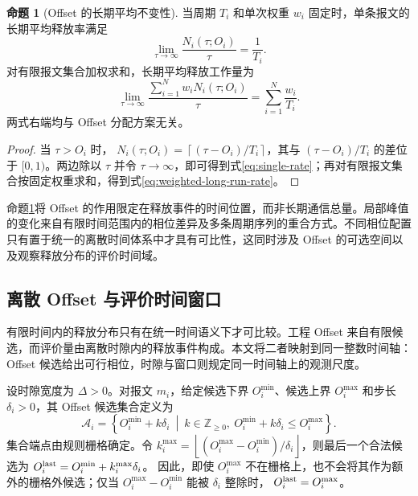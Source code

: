 \documentclass[UTF8,a4paper,twoside,zihao=-4]{ctexart}
\numberwithin{equation}{section}
\numberwithin{figure}{section}
\numberwithin{table}{section}
\theoremstyle{definition}
\newtheorem{proposition}{命题}
\newcommand{\Oset}{\mathcal{A}}
\numberwithin{algocf}{section}
\begin{document}
\begin{proposition}[Offset 的长期平均不变性]
\label{prop:offset-invariance}
当周期 $T_i$ 和单次权重 $w_i$ 固定时，单条报文的长期平均释放率满足
\begin{equation}
 \lim_{\tau\to\infty}\frac{N_i(\tau;O_i)}{\tau}
 =\frac{1}{T_i}.
\label{eq:single-rate}
\end{equation}
对有限报文集合加权求和，长期平均释放工作量为
\begin{equation}
 \lim_{\tau\to\infty}
 \frac{\sum_{i=1}^{N}w_iN_i(\tau;O_i)}{\tau}
 =\sum_{i=1}^{N}\frac{w_i}{T_i}.
\label{eq:weighted-long-run-rate}
\end{equation}
两式右端均与 Offset 分配方案无关。
\end{proposition}

\begin{proof}
当 $\tau>O_i$ 时，
$N_i(\tau;O_i)=\left\lceil(\tau-O_i)/T_i\right\rceil$，其与
$(\tau-O_i)/T_i$ 的差位于 $[0,1)$。两边除以 $\tau$ 并令
$\tau\to\infty$，即可得到式\eqref{eq:single-rate}；再对有限报文集合按固定权重求和，得到式\eqref{eq:weighted-long-run-rate}。
\end{proof}

命题\ref{prop:offset-invariance}将 Offset 的作用限定在释放事件的时间位置，而非长期通信总量。局部峰值的变化来自有限时间范围内的相位差异及多条周期序列的重合方式。不同相位配置只有置于统一的离散时间体系中才具有可比性，这同时涉及 Offset 的可选空间以及观察释放分布的评价时间域。

\subsection{离散 Offset 与评价时间窗口}

有限时间内的释放分布只有在统一时间语义下才可比较。工程 Offset 来自有限候选，而评价量由离散时隙内的释放事件构成。本文将二者映射到同一整数时间轴：Offset 候选给出可行相位，时隙与窗口则规定同一时间轴上的观测尺度。

设时隙宽度为 $\Delta>0$。对报文 $m_i$，给定候选下界 $O_i^{\min}$、候选上界 $O_i^{\max}$ 和步长 $\delta_i>0$，其 Offset 候选集合定义为
\begin{equation}
 \Oset_i
 =\left\{O_i^{\min}+k\delta_i\ \middle|\
 k\in\mathbb Z_{\ge0},\
 O_i^{\min}+k\delta_i\le O_i^{\max}\right\}.
\label{eq:offset-candidates}
\end{equation}
集合端点由规则栅格确定。令
$k_i^{\max}=\left\lfloor
 (O_i^{\max}-O_i^{\min})/\delta_i
 \right\rfloor$，则最后一个合法候选为
$O_i^{\rm last}=O_i^{\min}+k_i^{\max}\delta_i$。
因此，即使 $O_i^{\max}$ 不在栅格上，也不会将其作为额外的栅格外候选；仅当
$O_i^{\max}-O_i^{\min}$ 能被 $\delta_i$ 整除时，
$O_i^{\rm last}=O_i^{\max}$。
\end{document}
